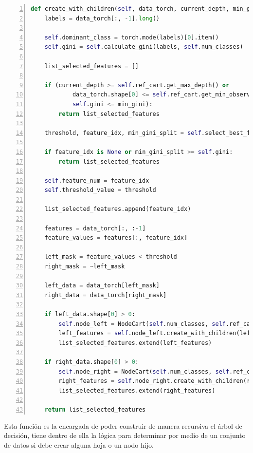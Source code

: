 \documentclass[12pt,a4paper]{article}
\begin{document}
    \begin{lstlisting}[language=Python, numbers=left, basicstyle=\ttfamily\tiny,label={lst:lstlisting5}]
  def create_with_children(self, data_torch, current_depth, min_gini=0.000001):
    labels = data_torch[:, -1].long()

    self.dominant_class = torch.mode(labels)[0].item()
    self.gini = self.calculate_gini(labels, self.num_classes)

    list_selected_features = []

    if (current_depth >= self.ref_cart.get_max_depth() or
            data_torch.shape[0] <= self.ref_cart.get_min_observations() or
            self.gini <= min_gini):
        return list_selected_features

    threshold, feature_idx, min_gini_split = self.select_best_feature_and_thresh(data_torch, self.num_classes)

    if feature_idx is None or min_gini_split >= self.gini:
        return list_selected_features

    self.feature_num = feature_idx
    self.threshold_value = threshold

    list_selected_features.append(feature_idx)

    features = data_torch[:, :-1]
    feature_values = features[:, feature_idx]

    left_mask = feature_values < threshold
    right_mask = ~left_mask

    left_data = data_torch[left_mask]
    right_data = data_torch[right_mask]

    if left_data.shape[0] > 0:
        self.node_left = NodeCart(self.num_classes, self.ref_cart, current_depth + 1)
        left_features = self.node_left.create_with_children(left_data, current_depth + 1, min_gini)
        list_selected_features.extend(left_features)

    if right_data.shape[0] > 0:
        self.node_right = NodeCart(self.num_classes, self.ref_cart, current_depth + 1)
        right_features = self.node_right.create_with_children(right_data, current_depth + 1, min_gini)
        list_selected_features.extend(right_features)

    return list_selected_features
    \end{lstlisting}

Esta función es la encargada de poder construir de manera recursiva el árbol de decisión, tiene dentro de ella
la lógica para determinar por medio de un conjunto de datos si debe crear alguna hoja o un nodo hijo.
\end{document}
